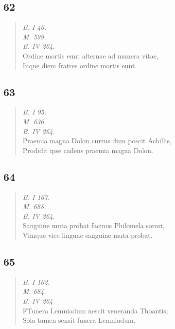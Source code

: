 \documentclass[11pt, a4paper]{report}
\begin{document}
            \subsection*{62}
      \begin{verse}
      \textit{B. I 46.} \\ \textit{M. 599.} \\ \textit{B. IV 264.} \\ Ordine mortis eunt alternae ad munera vitae, \\ Inque diem fratres ordine mortis eunt. \\ 
      \end{verse}
  
            \subsection*{63}
      \begin{verse}
      \textit{B. I 95.} \\ \textit{M. 636.} \\ \textit{B. IV 264.} \\ Praemia magna Dolon currus dum poscit Achillis, \\ Prodidit ipse cadens praemia magna Dolon. \\ 
      \end{verse}
  
            \subsection*{64}
      \begin{verse}
      \textit{B. I 167.} \\ \textit{M. 688.} \\ \textit{B. IV 264.} \\ Sanguine muta probat facinus Philomela sorori, \\ Vimque vice linguae sanguine muta probat. \\ 
      \end{verse}
  
            \subsection*{65}
      \begin{verse}
      \textit{B. I 162.} \\ \textit{M. 684.} \\ \textit{B. IV 264} \\ FTunera Lemniadum nescit veneranda Thoantis; \\ Sola tamen sensit funera Lemniadum. \\ 
      \end{verse}
  
\end{document}
